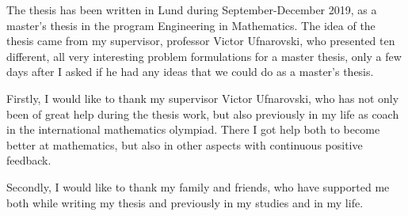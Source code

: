 The thesis has been written in Lund during September-December 2019, as a master's thesis in the program Engineering in Mathematics. The idea of the thesis came from my supervisor, professor Victor Ufnarovski, who presented ten different, all very interesting problem formulations for a master thesis, only a few days after I asked if he had any ideas that we could do as a master's thesis.

Firstly, I would like to thank my supervisor Victor Ufnarovski, who has not only been of great help during the thesis work, but also previously in my life as coach in the international mathematics olympiad. There I got help both to become better at mathematics, but also in other aspects with continuous positive feedback.

Secondly, I would like to thank my family and friends, who have supported me both while writing my thesis and previously in my studies and in my life.

